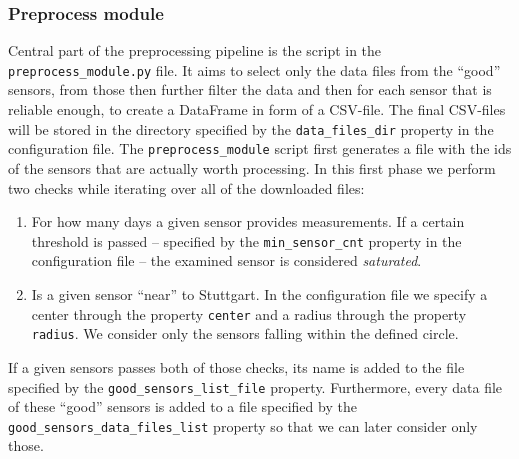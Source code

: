 \documentclass[12pt,a4paper,twoside]{scrartcl}
\numberwithin{equation}{section}
\begin{document}
\subsubsection{Preprocess module}\label{sec:preproc-module}
Central part of the preprocessing pipeline is the script in the \texttt{preprocess\_module.py} file. It aims to select only the data files from the ``good'' sensors, from those then further filter the data and then for each sensor that is reliable enough, to create a DataFrame in form of a CSV-file. The final CSV-files will be stored in the directory specified by the \texttt{data\_files\_dir} property in the configuration file. The \texttt{preprocess\_module} script first generates a file with the ids of the sensors that are actually worth processing. In this first phase we perform two checks while iterating over all of the downloaded files:
\begin{enumerate}
\item For how many days a given sensor provides measurements. If a certain threshold is passed -- specified by the \texttt{min\_sensor\_cnt} property in the configuration file -- the examined sensor is considered \emph{saturated}.
\item Is a given sensor ``near'' to Stuttgart. In the configuration file we specify a center through the property \texttt{center} and a radius through the property \texttt{radius}. We consider only the sensors falling within the defined circle.
\end{enumerate}
If a given sensors passes both of those checks, its name is added to the file specified by the \texttt{good\_sensors\_list\_file} property. Furthermore, every data file of these ``good'' sensors is added to a file specified by the \texttt{good\_sensors\_data\_files\_list} property so that we can later consider only those.
\end{document}
